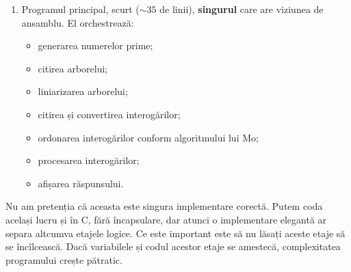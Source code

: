 \documentclass[../main.tex]{subfiles}
\begin{document}
\begin{enumerate}
  \item Programul principal, scurt ($\sim 35$ de linii), \textbf{singurul} care are viziunea de ansamblu. El orchestrează:

  \begin{itemize}
    \item generarea numerelor prime;
    \item citirea arborelui;
    \item liniarizarea arborelui;
    \item citirea și convertirea interogărilor;
    \item ordonarea interogărilor conform algoritmului lui Mo;
    \item procesarea interogărilor;
    \item afișarea răspunsului.
  \end{itemize}
\end{enumerate}

Nu am pretenția că aceasta este singura implementare corectă. Putem coda același lucru și în C, fără încapsulare, dar atunci o implementare elegantă ar separa altcumva etajele logice. Ce este important este să nu lăsați aceste etaje să se încîlcească. Dacă variabilele și codul acestor etaje se amestecă, complexitatea programului crește pătratic.
\end{document}
